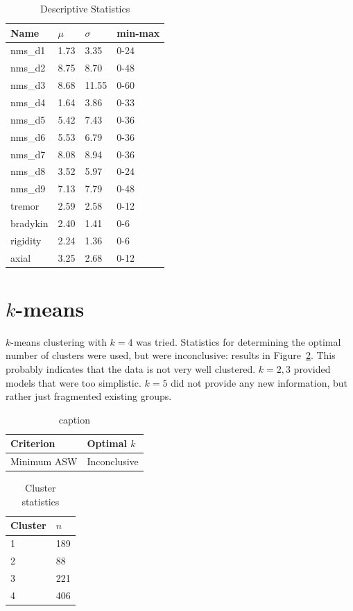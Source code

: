 \documentclass[letterpaper,12pt]{article}
\begin{document}
\begin{table}[h]
  \centering
  \begin{tabular}{l|l|l|l}
  Name  &       $\mu$ & $\sigma$ & min-max \\
         \hline
nms\_d1&   1.73&  3.35&   0-24 \\
nms\_d2&   8.75&  8.70&   0-48 \\
nms\_d3&   8.68& 11.55&   0-60 \\
nms\_d4&   1.64&  3.86&   0-33 \\
nms\_d5&   5.42&  7.43&   0-36 \\
nms\_d6&   5.53&  6.79&   0-36 \\
nms\_d7&   8.08&  8.94&   0-36 \\
nms\_d8&   3.52&  5.97&   0-24 \\
nms\_d9&   7.13&  7.79&   0-48 \\
tremor&   2.59&  2.58&   0-12 \\
bradykin& 2.40&  1.41&   0-6 \\
rigidity& 2.24&  1.36&   0-6 \\
axial&    3.25&  2.68&   0-12 \\
  \end{tabular}
  \caption{Descriptive Statistics}
  \label{tab:descriptive-statistics}
\end{table}

\section{$k$-means}

$k$-means clustering with $k = 4$ was tried. Statistics for determining the
optimal number of clusters were used, but were inconclusive: results in
Figure~\ref{tab:numclus}. This probably indicates that the data is not very
well clustered. $k = 2, 3$ provided models that were too simplistic. $k = 5$
did not provide any new information, but rather just fragmented existing
groups.

\begin{table}[h]
  \centering
  \caption{caption}
  \label{tab:numclus}
  \begin{tabular}{l|l}
    Criterion & Optimal $k$ \\
    \hline
    Minimum ASW & Inconclusive  \\
  \end{tabular}
\end{table}
\begin{table}[h]
  \centering
  \caption{Cluster statistics}
  \label{tab:cluster_stats}
  \begin{tabular}{l|l}
    Cluster & $n$ \\
    \hline
    1 & 189 \\
    2 & 88 \\
    3 & 221 \\
    4 & 406 \\
  \end{tabular}
\end{table}
\end{document}
